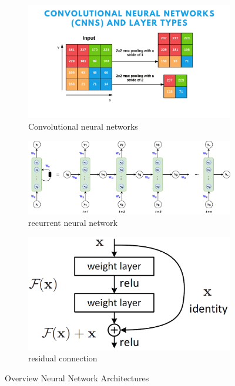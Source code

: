 \begin{figure}
    \begin{subfigure}{0.31\textwidth}
      \includegraphics[width=\linewidth]{images/cnns.png}
      \caption{Convolutional neural networks} \label{fig:cnns}
    \end{subfigure}%
    \hspace*{\fill}   %
    \begin{subfigure}{0.31\textwidth}
      \includegraphics[width=\linewidth]{images/rnns.png}
      \caption{recurrent neural network} \label{fig:rnns}
    \end{subfigure}%
    \hspace*{\fill}   %
    \begin{subfigure}{0.31\textwidth}
        \includegraphics[width=\linewidth]{images/resnet.png}
        \caption{residual connection} \label{fig:resnet}
      \end{subfigure}%
    \hspace*{\fill}   %
  \caption{Overview Neural Network Architectures} \label{fig:NN_architectures_Overview}
\end{figure}

